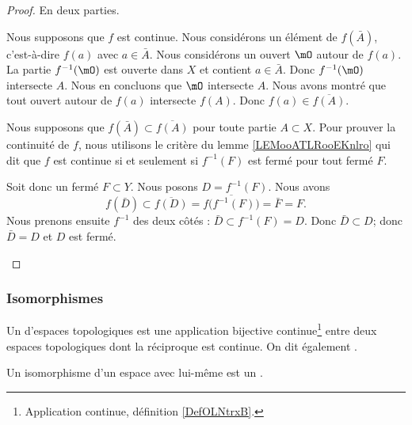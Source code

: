 \begin{proof}
	En deux parties.
	\begin{subproof}
		\spitem[\( \Rightarrow\)]
		Nous supposons que \( f\) est continue. Nous considérons un élément de \( f(\bar A)\), c'est-à-dire \( f(a)\) avec \( a\in\bar A\). Nous considérons un ouvert \( \mO\) autour de \( f(a)\). La partie \( f^{-1}(\mO)\) est ouverte dans \( X\) et contient \( a\in\bar A\). Donc \( f^{-1}(\mO)\) intersecte \( A\). Nous en concluons que \( \mO\) intersecte \( A\). Nous avons montré que tout ouvert autour de \( f(a)\) intersecte \( f(A)\). Donc \( f(a)\in\overline{f(A)}\).

		\spitem[\( \Leftarrow\)]
		Nous supposons que \( f(\bar A)\subset \overline{f(A)}\) pour toute partie \( A\subset X\). Pour prouver la continuité de \( f\), nous utilisons le critère du lemme \ref{LEMooATLRooEKnlro} qui dit que \( f\) est continue si et seulement si \( f^{-1}(F)\) est fermé pour tout fermé \( F\).

		Soit donc un fermé \( F\subset Y\). Nous posons \( D=f^{-1}(F)\). Nous avons
		\begin{equation}
			f(\bar D)\subset \overline{f(D)}=\overline{f\big( f^{-1}(F) \big)}=\bar F=F.
		\end{equation}
		Nous prenons ensuite \( f^{-1}\) des deux côtés : \( \bar D\subset f^{-1}(F)=D\). Donc \( \bar D\subset D\); donc \( \bar D=D\) et \( D\) est fermé.
	\end{subproof}
\end{proof}


\subsubsection{Isomorphismes}

\begin{definition}      \label{DEFooYPGQooMAObTO}
	Un  d'espaces topologiques est une application bijective continue\footnote{Application continue, définition \ref{DefOLNtrxB}.} entre deux espaces topologiques dont la réciproque est continue. On dit également .

	Un isomorphisme d'un espace avec lui-même est un .
\end{definition}


